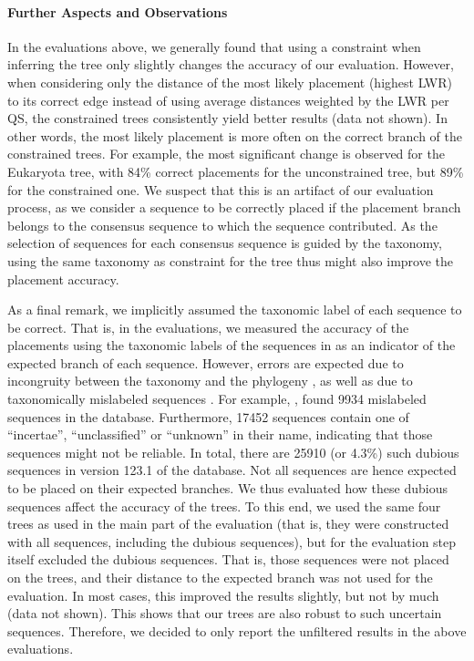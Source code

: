 \paragraph{Further Aspects and Observations}
\label{ch:AutomaticTrees:sec:Evaluation:sub:Accuracy:par:FurtherAspectsAndObservations}

In the evaluations above, we generally found that using a constraint
when inferring the tree only slightly changes the accuracy of our evaluation.
However, when considering only the distance of the most likely placement (highest \ac{LWR}) to its correct edge
instead of using average distances weighted by the \ac{LWR} per \ac{QS},
the constrained trees consistently yield better results (data not shown).
In other words, the most likely placement is more often on the correct branch of the constrained trees.
For example, the most significant change is observed for the Eukaryota tree,
with 84\% correct placements for the unconstrained tree, but 89\% for the constrained one.
We suspect that this is an artifact of our evaluation process,
as we consider a sequence to be correctly placed if the placement branch belongs to the consensus sequence
to which the sequence contributed.
As the selection of sequences for each consensus sequence is guided by the taxonomy,
using the same taxonomy as constraint for the tree thus might also improve the placement accuracy.

As a final remark, we implicitly assumed the taxonomic label of each sequence to be correct.
That is, in the evaluations, we measured the accuracy of the placements
using the taxonomic labels of the sequences in  as an indicator of the expected branch of each sequence.
However, errors are expected due to incongruity between the taxonomy and the phylogeny \citep{Moreira2000},
as well as due to taxonomically mislabeled sequences \citep{Kozlov2016}.
For example,  \citep{Kozlov2016},
found \num{9 934} mislabeled sequences in the  database.
Furthermore, \num{17 452} sequences contain one of ``incertae'', ``unclassified'' or ``unknown'' in their name,
indicating that those sequences might not be reliable.
In total, there are \num{25 910} (or \num{4.3}\%) such dubious sequences in version 123.1 of the  database.
Not all sequences are hence expected to be placed on their expected branches.
We thus evaluated how these dubious sequences affect the accuracy of the trees.
To this end, we used the same four trees as used in the main part of the evaluation
(that is, they were constructed with all sequences, including the dubious sequences),
but for the evaluation step itself excluded the dubious sequences.
That is, those sequences were not placed on the trees,
and their distance to the expected branch was not used for the evaluation.
In most cases, this improved the results slightly, but not by much (data not shown).
This shows that our trees are also robust to such uncertain sequences.
Therefore, we decided to only report the unfiltered results in the above evaluations.

